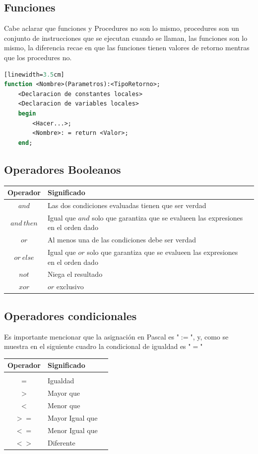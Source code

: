 \documentclass[10pt,journal,compsoc]{IEEEtran}
\begin{document}
\subsection{Funciones}
Cabe aclarar que funciones y Procedures no son lo mismo, procedures son un conjunto de instrucciones que se ejecutan cuando se llaman, las funciones son lo mismo, la diferencia recae en que las funciones tienen valores de retorno mentras que los procedures no.
\begin{lstlisting}[language=Pascal, caption = {Sintaxis de una funci\'on}][linewidth=3.5cm]
function <Nombre>(Parametros):<TipoRetorno>;
	<Declaracion de constantes locales>
	<Declaracion de variables locales>
	begin
		<Hacer...>;
		<Nombre>: = return <Valor>;
	end;
\end{lstlisting}

\subsection{Operadores Booleanos}
\begin{tabular}{c p{6cm} p{15cm}}
	Operador & Significado\\
	\hline\hline
	$and$ & Las dos condiciones evaluadas tienen que ser verdad\\\hline
	$and~then$ & Igual que $and$ solo que garantiza que se evalueen las expresiones en el orden dado\\\hline
	$or$ & Al menos una de las condiciones debe ser verdad\\\hline
	$or~else$ & Igual que $or$ solo que garantiza que se evalueen las expresiones en el orden dado\\\hline
	$not$ & Niega el resultado\\\hline
	$xor$ & $or$ exclusivo\\ 
	\hline 
\end{tabular}

\subsection{Operadores condicionales}
Es importante mencionar que la asignaci\'on en Pascal es "$:=$", y, como se muestra en el siguiente cuadro la condicional de igualdad es "$=$"\newline\newline
\begin{tabular}{c p{3cm} p{5cm}}
	Operador & Significado\\
	\hline\hline\\
	$=$ & Igualdad\\
	$>$ & Mayor que\\
	$<$ & Menor que\\
	$>=$ & Mayor Igual que\\
	$<=$ &Menor Igual que\\
	$<>$ & Diferente\\
	\hline
\end{tabular}
\end{document}
